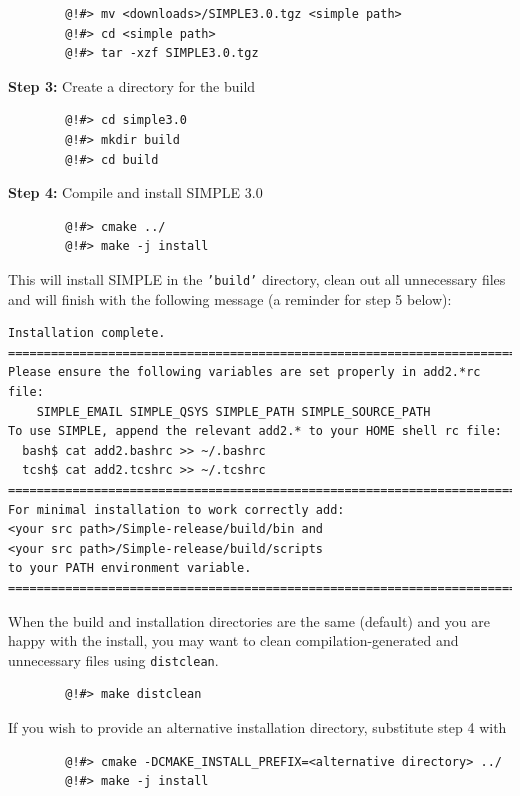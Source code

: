 \documentclass[a4paper,11pt]{article}
\begin{document}
\begin{verbatim}
        @!#> mv <downloads>/SIMPLE3.0.tgz <simple path>
        @!#> cd <simple path>
        @!#> tar -xzf SIMPLE3.0.tgz
\end{verbatim}

\noindent{}\textbf{Step 3:} Create a directory for the build

\begin{verbatim}
        @!#> cd simple3.0
        @!#> mkdir build
        @!#> cd build
\end{verbatim}

\noindent{}\textbf{Step 4:} Compile and install SIMPLE 3.0

\begin{verbatim}
        @!#> cmake ../
        @!#> make -j install
\end{verbatim}

\noindent{}This will install SIMPLE in the \texttt{'build'} directory, clean out all unnecessary
files and will finish with the following message (a reminder for step 5 below):

\begin{verbatim}
Installation complete.
==========================================================================
Please ensure the following variables are set properly in add2.*rc file:
    SIMPLE_EMAIL SIMPLE_QSYS SIMPLE_PATH SIMPLE_SOURCE_PATH
To use SIMPLE, append the relevant add2.* to your HOME shell rc file:
  bash$ cat add2.bashrc >> ~/.bashrc
  tcsh$ cat add2.tcshrc >> ~/.tcshrc
==========================================================================
For minimal installation to work correctly add:
<your src path>/Simple-release/build/bin and
<your src path>/Simple-release/build/scripts
to your PATH environment variable.
==========================================================================
\end{verbatim}

\noindent{}When the build and installation directories are the same (default) and you are
happy with the install, you may want to clean compilation-generated and
unnecessary files using \texttt{distclean}.

\begin{verbatim}
        @!#> make distclean
\end{verbatim}

\noindent{}If you wish to provide an alternative installation directory, substitute step 4 with

\begin{verbatim}
        @!#> cmake -DCMAKE_INSTALL_PREFIX=<alternative directory> ../
        @!#> make -j install
\end{verbatim}
\end{document}
